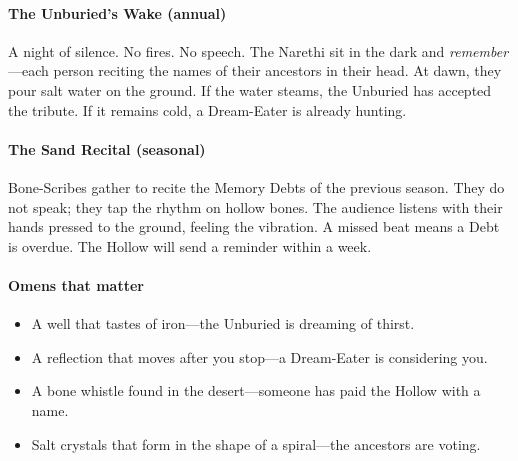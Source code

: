 \documentclass[11pt]{article}
\begin{document}
\paragraph{The Unburied's Wake (annual)} A night of silence. No fires. No speech. The Narethi sit in the dark and \textit{remember}---each person reciting the names of their ancestors in their head. At dawn, they pour salt water on the ground. If the water steams, the Unburied has accepted the tribute. If it remains cold, a Dream-Eater is already hunting.

\paragraph{The Sand Recital (seasonal)} Bone-Scribes gather to recite the Memory Debts of the previous season. They do not speak; they tap the rhythm on hollow bones. The audience listens with their hands pressed to the ground, feeling the vibration. A missed beat means a Debt is overdue. The Hollow will send a reminder within a week.

\paragraph{Omens that matter}
\begin{itemize}[leftmargin=*,nosep]
    \item A well that tastes of iron---the Unburied is dreaming of thirst.
    \item A reflection that moves after you stop---a Dream-Eater is considering you.
    \item A bone whistle found in the desert---someone has paid the Hollow with a name.
    \item Salt crystals that form in the shape of a spiral---the ancestors are voting.
\end{itemize}
\end{document}
